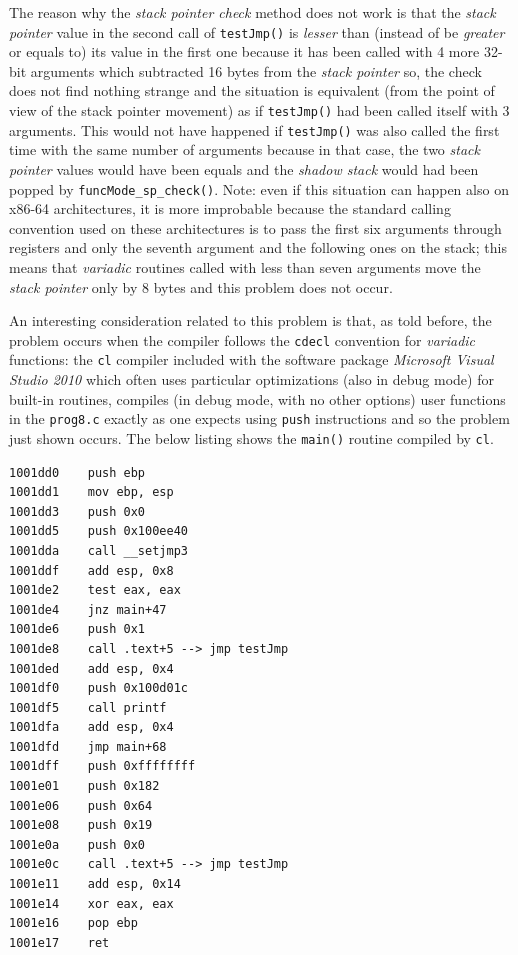 \documentclass[a4paper,10pt]{report}
\begin{document}
The reason why the \emph{stack pointer check} method does not work is that
the \emph{stack pointer} value in the second call of \verb|testJmp()| is \emph{lesser}
than (instead of be \emph{greater} or equals to) 
its value in the first one because it has been called with 4 more 32-bit arguments 
which subtracted 16 bytes from the \emph{stack pointer} so, the check does not 
find nothing strange and the situation is equivalent (from the point of view of the stack pointer movement) as if \verb|testJmp()| had been called itself with 3 arguments.
This would not have happened if \verb|testJmp()| was also called the first time with 
the same number of arguments because in that case, the two \emph{stack pointer} values
would have been equals and the \emph{shadow stack} would had been popped 
by \verb|funcMode_sp_check()|. Note: even if this situation can happen also
on x86-64 architectures, it is more improbable because the standard calling convention
used on these architectures is to pass the first six arguments through registers
and only the seventh argument and the following ones on the stack; this means
that \emph{variadic} routines called with less than seven arguments move
the \emph{stack pointer} only by 8 bytes and this problem does not occur.

An interesting consideration related to this problem is that, as told before,
the problem occurs when the compiler follows the \verb|cdecl| 
convention for \emph{variadic} functions:
the \verb|cl| compiler included with the software package 
\emph{Microsoft Visual Studio 2010} which often uses particular optimizations (also in debug mode) for built-in routines, compiles (in debug mode, with no other options) 
user functions in the \verb|prog8.c| exactly as one expects using \verb|push| instructions
and so the problem just shown occurs. The below listing shows the \verb|main()| routine
compiled by \verb|cl|.

\begin{lstlisting}[language={[x86masm]Assembler}, 
	label=p8mainCL, caption={\texttt{main()} disassembly of \texttt{prog8.c} compiled with \texttt{cl}}, frame=leftline]
1001dd0    push ebp
1001dd1    mov ebp, esp
1001dd3    push 0x0
1001dd5    push 0x100ee40
1001dda    call __setjmp3
1001ddf    add esp, 0x8
1001de2    test eax, eax
1001de4    jnz main+47
1001de6    push 0x1
1001de8    call .text+5 --> jmp testJmp
1001ded    add esp, 0x4
1001df0    push 0x100d01c
1001df5    call printf
1001dfa    add esp, 0x4
1001dfd    jmp main+68
1001dff    push 0xffffffff
1001e01    push 0x182
1001e06    push 0x64
1001e08    push 0x19
1001e0a    push 0x0
1001e0c    call .text+5 --> jmp testJmp
1001e11    add esp, 0x14
1001e14    xor eax, eax
1001e16    pop ebp
1001e17    ret 
\end{lstlisting}
\end{document}
